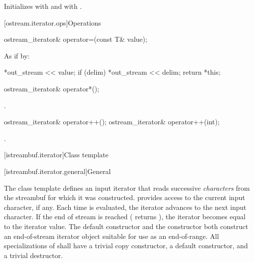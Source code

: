 \begin{itemdescr}
\pnum
\effects
Initializes  with  and
 with .
\end{itemdescr}

[ostream.iterator.ops]{Operations}

%
\begin{itemdecl}
ostream_iterator& operator=(const T& value);
\end{itemdecl}

\begin{itemdescr}
\pnum
\effects
As if by:
\begin{codeblock}
*out_stream << value;
if (delim)
  *out_stream << delim;
return *this;
\end{codeblock}
\end{itemdescr}

%
\begin{itemdecl}
ostream_iterator& operator*();
\end{itemdecl}

\begin{itemdescr}
\pnum
\returns
{}.
\end{itemdescr}

%
\begin{itemdecl}
ostream_iterator& operator++();
ostream_iterator& operator++(int);
\end{itemdecl}

\begin{itemdescr}
\pnum
\returns
{}.
\end{itemdescr}

[istreambuf.iterator]{Class template }

[istreambuf.iterator.general]{General}

\pnum
The
class template
defines an input iterator that
reads successive
\textit{characters}
from the streambuf for which it was constructed.
provides access to the current input character, if any.
Each time
is evaluated, the iterator advances to the next input character.
If the end of stream is reached ( returns
),
the iterator becomes equal to the
iterator value.
The default constructor
and the constructor
both construct an end-of-stream iterator object suitable for use
as an end-of-range.
All specializations of  shall have a trivial copy
constructor, a  default constructor, and a trivial destructor.

